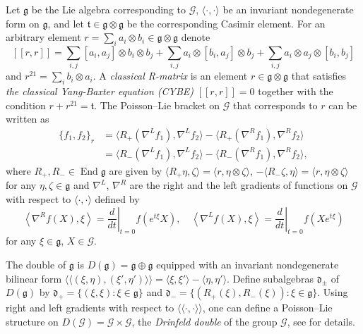 \documentclass{amsart}
\theoremstyle{definition}
\theoremstyle{remark}
\numberwithin{equation}{section}
\numberwithin{theorem}{section}
\def\D{{\mathfrak d}}
\def\G{{\mathcal G}}
\def\g{\mathfrak g}
\def\End{\operatorname{End}}
\def\Id{{\operatorname {Id}}}
\def\Kil{\langle {\cdot},{\cdot}\rangle}
\begin{document}
Let $\g$ be the Lie algebra corresponding to $\G$, $\Kil$ be an invariant nondegenerate form on $\g$,
 and let $\mathfrak{t}\in \g\otimes\g$ be the corresponding Casimir element.
For an arbitrary element $r=\sum_i a_i\otimes b_i\in\g\otimes\g$ denote
\[
[[r,r]]=\sum_{i,j} [a_i,a_j]\otimes b_i\otimes b_j+\sum_{i,j} a_i\otimes [b_i,a_j]\otimes b_j+
\sum_{i,j} a_i\otimes a_j\otimes [ b_i,b_j]
\]
and $r^{21}=\sum_i b_i\otimes a_i$.
A {\em classical R-matrix} is an element $r\in \g\otimes\g$ that satisfies
{\em the classical Yang-Baxter equation (CYBE)\/} $[[r, r]] =0$
together with the condition $r + r^{21} = \mathfrak{t}$.
The Poisson--Lie bracket on $\G$ that corresponds to $r$ can be written as
\begin{equation}\label{sklyabra}
\begin{aligned}
\{f_1,f_2\}_r &= \langle R_+(\nabla^L f_1), \nabla^L f_2 \rangle - \langle R_+(\nabla^R f_1), \nabla^R f_2 \rangle\\
&= \langle R_-(\nabla^L f_1), \nabla^L f_2 \rangle - \langle R_-(\nabla^R f_1), \nabla^R f_2 \rangle,
\end{aligned}
\end{equation} 
where $R_+,R_- \in \End \g$ are given by $\langle R_+ \eta, \zeta\rangle = \langle r, \eta\otimes\zeta \rangle$, 
$-\langle R_- \zeta, \eta\rangle = \langle r, \eta\otimes\zeta \rangle$ for any $\eta,\zeta\in \g$ and  
$\nabla^L$, $\nabla^R$ are the right and the left gradients of functions on $\G$ with respect to $\Kil$ 
defined by
\begin{equation*}
\left\langle \nabla^R f(X),\xi\right\rangle=\left.\frac d{dt}\right|_{t=0}f(e^{t\xi}X),  \quad
\left\langle \nabla^L f(X),\xi\right\rangle=\left.\frac d{dt}\right|_{t=0}f(Xe^{t\xi})
\end{equation*}
for any $\xi\in\g$, $X\in\G$. 

The double of $\g$ is 
$D(\g)=\g  \oplus \g$ equipped with an invariant nondegenerate bilinear form
$\langle\langle (\xi,\eta), (\xi',\eta')\rangle\rangle = \langle \xi, \xi'\rangle - \langle \eta, \eta'\rangle$. 
Define subalgebras $\D_\pm$ of $D(\g)$ by
$\D_+=\{( \xi,\xi) : \xi \in\g\}$ and $\D_-=\{ (R_+(\xi),R_-(\xi)) : \xi \in\g\}$.
Using right and left gradients with respect to $\langle\langle {\cdot} ,{\cdot} \rangle\rangle$, 
one can define 
a Poisson--Lie structure on $D(\G)=\G\times \G$, the {\em Drinfeld double\/} of the group $\G$, see \cite{GSVdouble}
for details.
\end{document}
